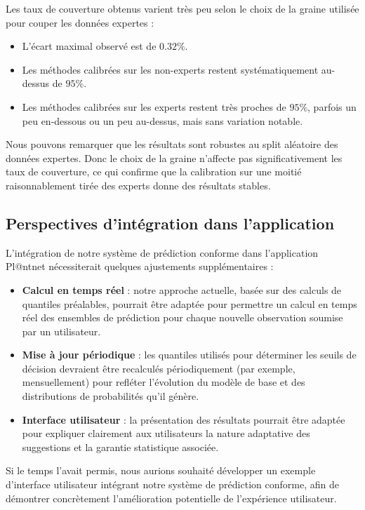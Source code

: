 \documentclass[a4paper,12pt]{article}
\begin{document}
Les taux de couverture obtenus varient très peu selon le choix de la graine utilisée pour couper les données expertes :

\begin{itemize}
    \item L’écart maximal observé est de $0.32\%$.
    \item Les méthodes calibrées sur les non-experts restent systématiquement au-dessus de $95\%$.
    \item Les méthodes calibrées sur les experts restent très proches de $95\%$, parfois un peu en-dessous ou un peu au-dessus, mais sans variation notable.
\end{itemize}

Nous pouvons remarquer que les résultats sont robustes au split aléatoire des données expertes. Donc le choix de la graine n’affecte pas significativement les taux de couverture, ce qui confirme que la calibration sur une moitié raisonnablement tirée des experts donne des résultats stables.

\subsection{Perspectives d'intégration dans l'application}

L'intégration de notre système de prédiction conforme dans l'application Pl@ntnet nécessiterait quelques ajustements supplémentaires :
\begin{itemize}
    \item \textbf{Calcul en temps réel} : notre approche actuelle, basée sur des calculs de quantiles préalables, pourrait être adaptée pour permettre un calcul en temps réel des ensembles de prédiction pour chaque nouvelle observation soumise par un utilisateur.
    \item \textbf{Mise à jour périodique} : les quantiles utilisés pour déterminer les seuils de décision devraient être recalculés périodiquement (par exemple, mensuellement) pour refléter l'évolution du modèle de base et des distributions de probabilités qu'il génère.
    \item \textbf{Interface utilisateur} : la présentation des résultats pourrait être adaptée pour expliquer clairement aux utilisateurs la nature adaptative des suggestions et la garantie statistique associée.
\end{itemize}

\vspace{0.2cm}

Si le temps l'avait permis, nous aurions souhaité développer un exemple d'interface utilisateur intégrant notre système de prédiction conforme, afin de démontrer concrètement l'amélioration potentielle de l'expérience utilisateur.
\end{document}
